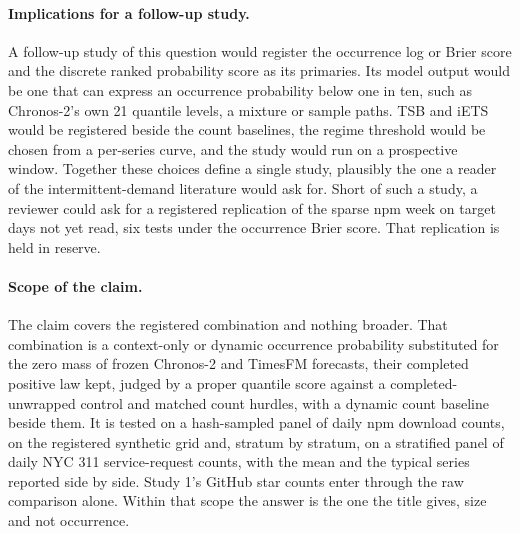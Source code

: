 \paragraph{Implications for a follow-up study.} A follow-up study of this question would register the
occurrence log or Brier score and the discrete ranked probability score as its primaries. Its model output
would be one that can express an occurrence probability below one in ten, such as Chronos-2's own 21 quantile
levels, a mixture or sample paths. TSB and iETS would be registered beside the count baselines, the regime
threshold would be chosen from a per-series curve, and the study would run on a prospective window. Together
these choices define a single study, plausibly the one a reader of the intermittent-demand literature would
ask for. Short of such a study, a reviewer could ask for a registered replication of the sparse npm week on
target days not yet read, six tests under the occurrence Brier score. That replication is held in reserve.

\paragraph{Scope of the claim.} The claim covers the registered combination and nothing broader. That
combination is a context-only or dynamic occurrence probability substituted for the zero mass of frozen
Chronos-2 and TimesFM forecasts, their completed positive law kept, judged by a proper quantile score against
a completed-unwrapped control and matched count hurdles, with a dynamic count baseline beside them. It is
tested on a hash-sampled panel of daily npm download counts, on the registered synthetic grid and, stratum by
stratum, on a stratified panel of daily NYC 311 service-request counts, with the mean and the typical series
reported side by side. Study 1's GitHub star counts enter through the raw comparison alone. Within that scope
the answer is the one the title gives, size and not occurrence.
